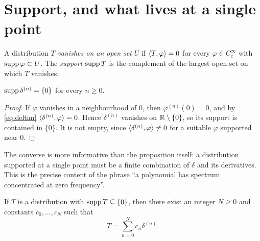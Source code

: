 \section{Support, and what lives at a single point}

\begin{definition}[support]\label{def:support}
A distribution $T$ \emph{vanishes on an open set} $U$ if $\langle T,\varphi\rangle=0$ for every
$\varphi\in C_{c}^{\infty}$ with $\operatorname{supp}\varphi\subset U$. The \emph{support} $\operatorname{supp} T$ is the
complement of the largest open set on which $T$ vanishes.
\end{definition}

\begin{proposition}\label{prop:suppdelta}
$\operatorname{supp}\delta^{(n)}=\{0\}$ for every $n\ge0$.
\end{proposition}

\begin{proof}
If $\varphi$ vanishes in a neighbourhood of $0$, then $\varphi^{(n)}(0)=0$, and by \eqref{eq:deltan}
$\langle \delta^{(n)},\varphi\rangle=0$. Hence $\delta^{(n)}$ vanishes on $\mathbb{R}\setminus\{0\}$, so its support
is contained in $\{0\}$. It is not empty, since $\langle \delta^{(n)},\varphi\rangle\neq0$ for a suitable
$\varphi$ supported near $0$.
\end{proof}

The converse is more informative than the proposition itself: a distribution supported at a single
point must be a finite combination of $\delta$ and its derivatives. This is the precise content of
the phrase ``a polynomial has spectrum concentrated at zero frequency''.

\begin{theorem}\label{thm:support0}
If $T$ is a distribution with $\operatorname{supp} T\subseteq\{0\}$, then there exist an integer $N\ge0$ and
constants $c_{0},\dots,c_{N}$ such that
\begin{equation}
T=\sum_{n=0}^{N}c_{n}\delta^{(n)} .
\end{equation}
\end{theorem}

